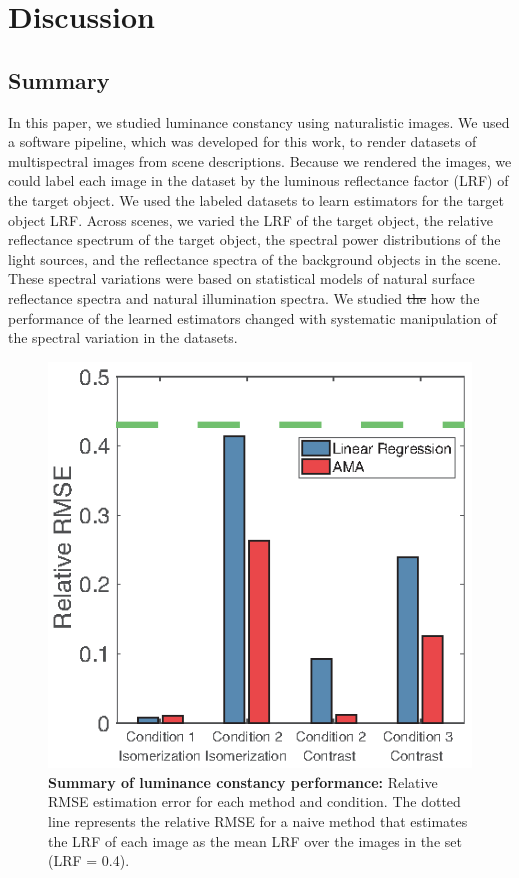 \documentclass{jov}
\providecommand{\DIFdeltex}[1]{{\protect\color{red}\sout{#1}}}                      %
\providecommand{\DIFdelbegin}{} %
\providecommand{\DIFdelend}{} %
\providecommand{\DIFaddbeginFL}{} %
\providecommand{\DIFaddendFL}{} %
\providecommand{\DIFdelbeginFL}{} %
\providecommand{\DIFdelendFL}{} %
\providecommand{\DIFdel}[1]{\texorpdfstring{\DIFdeltex{#1}}{}} %
\newcommand{\DIFscaledelfig}{0.5}
\newlength{\DIFdelgraphicswidth} %
\newlength{\DIFdelgraphicsheight} %
\newcommand{\DIFaddincludegraphics}[2][]{{\color{blue}\fbox{\DIFOincludegraphics[#1]{#2}}}} %
\newcommand{\DIFdelincludegraphics}[2][]{%
\sbox{\DIFdelgraphicsbox}{\DIFOincludegraphics[#1]{#2}}%
\settoboxwidth{\DIFdelgraphicswidth}{\DIFdelgraphicsbox} %
\settoboxtotalheight{\DIFdelgraphicsheight}{\DIFdelgraphicsbox} %
\scalebox{\DIFscaledelfig}{%
\parbox[b]{\DIFdelgraphicswidth}{\usebox{\DIFdelgraphicsbox}\\[-\baselineskip] \rule{\DIFdelgraphicswidth}{0em}}\llap{\resizebox{\DIFdelgraphicswidth}{\DIFdelgraphicsheight}{%
\setlength{\unitlength}{\DIFdelgraphicswidth}%
\begin{picture}(1,1)%
\thicklines\linethickness{2pt} %
{\color[rgb]{1,0,0}\put(0,0){\framebox(1,1){}}}%
{\color[rgb]{1,0,0}\put(0,0){\line( 1,1){1}}}%
{\color[rgb]{1,0,0}\put(0,1){\line(1,-1){1}}}%
\end{picture}%
}\hspace*{3pt}}} %
} %
\DeclareRobustCommand{\DIFdelbegin}{\DIFOdelbegin \let\includegraphics\DIFdelincludegraphics} %
\DeclareRobustCommand{\DIFdelend}{\DIFOaddend \let\includegraphics\DIFOincludegraphics} %
\DeclareRobustCommand{\DIFaddbeginFL}{\DIFOaddbeginFL \let\includegraphics\DIFaddincludegraphics} %
\DeclareRobustCommand{\DIFaddendFL}{\DIFOaddendFL \let\includegraphics\DIFOincludegraphics} %
\DeclareRobustCommand{\DIFdelbeginFL}{\DIFOdelbeginFL \let\includegraphics\DIFdelincludegraphics} %
\DeclareRobustCommand{\DIFdelendFL}{\DIFOaddendFL \let\includegraphics\DIFOincludegraphics} %
\begin{document}
\section{Discussion} \label{Discussion}

\subsection{Summary}
In this paper, we studied luminance constancy using naturalistic images.
We used a software pipeline, which was developed for this work, to render datasets of multispectral images from scene descriptions.
Because we rendered the images, we could label each image in the dataset by the luminous reflectance factor (LRF) of the target object.
We used the labeled datasets to learn estimators for the target object LRF.
Across scenes, we varied the LRF of the target object, the relative reflectance spectrum of the target object, 
the spectral power distributions of the light sources, and the reflectance spectra of the background objects in the scene.
These spectral variations were based on statistical models of natural surface reflectance spectra and natural illumination spectra.
We studied \DIFdelbegin \DIFdel{the }\DIFdelend how the performance of the learned estimators changed with systematic manipulation of the spectral variation in the datasets.

\begin{figure}
\centering
\DIFdelbeginFL %
\DIFdelendFL \DIFaddbeginFL \includegraphics{Figure14.eps}
\DIFaddendFL \caption{{\bf Summary of luminance constancy performance:} Relative RMSE estimation error for each method and condition. The dotted line represents the relative RMSE for a naive method that estimates the LRF of each image as the mean LRF over the images in the set (LRF = 0.4).}
 \label{fig:barGraphs}
\end{figure}
\end{document}
